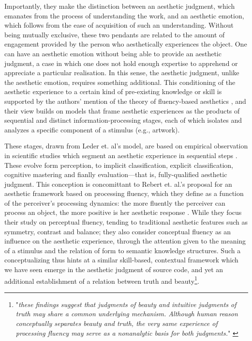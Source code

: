 Importantly, they make the distinction between an aesthetic judgment, which emanates from the process of understanding the work, and an aesthetic emotion, which follows from the ease of acquisition of such an understanding. Without being mutually exclusive, these two pendants are related to the amount of engagement provided by the person who aesthetically experiences the object. One can have an aesthetic emotion without being able to provide an aesthetic judgment, a case in which one does not hold enough expertise to apprehend or appreciate a particular realisation. In this sense, the aesthetic judgment, unlike the aesthetic emotion, requires something additional. This conditioning of the aesthetic experience to a certain kind of pre-existing knowledge or skill is supported by the authors' mention of the theory of fluency-based aesthetics \citep{chatterjee_neuroscience_2016}, and their view builds on models that frame aesthetic experiences as the products of sequential and distinct information-processing stages, each of which isolates and analyzes a specific component of a stimulus (e.g., artwork).

These stages, drawn from Leder et. al's model, are based on empirical observation in scientific studies which segment an aesthetic experience in sequential steps \citep{leder_model_2004}. These evolve form perception, to implicit classification, explicit classification, cognitive mastering and fianlly evaluation—that is, fully-qualified aesthetic judgment. This conception is concomittant to Rebert et. al.'s proposal for an aesthetic framework based on processing fluency, which they define as a function of the perceiver's processing dynamics: the more fluently the perceiver can process an object, the more positive is her aesthetic response \citep{reber_processing_2004}. While they focus their study on perceptual fluency, tending to traditional aesthetic features such as symmetry, contrast and balance; they also consider conceptual fluency as an influence on the aesthetic experience, through the attention given to the meaning of a stimulus and the relation of form to semantic knowledge structures. Such a conceptualizing thus hints at a similar skill-based, contextual framework which we have seen emerge in the aesthetic judgment of source code, and yet an additional establishment of a relation between truth and beauty\footnote{"\emph{these findings suggest that judgments of beauty and intuitive judgments of truth may share a common underlying mechanism. Although human reason conceptually separates beauty and truth, the very same experience of processing fluency may serve as a nonanalytic basis for both judgments.}" \citep{reber_processing_2004}}.

